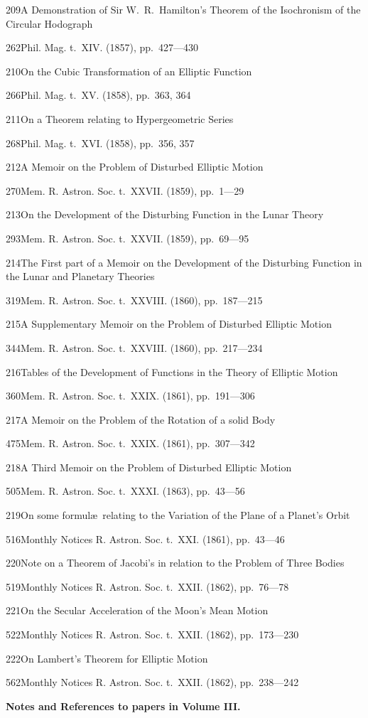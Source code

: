 \documentclass[11pt,a4paper]{book}
\providecommand{\tocentry}[2]{#1\dotfill #2\par}
\begin{document}
\tocentry{209}{A Demonstration of Sir W.~R.~Hamilton's Theorem of the Isochronism of the Circular Hodograph}{262}{Phil. Mag. t.~XIV. (1857), pp.~427---430}

\tocentry{210}{On the Cubic Transformation of an Elliptic Function}{266}{Phil. Mag. t.~XV. (1858), pp.~363, 364}

\tocentry{211}{On a Theorem relating to Hypergeometric Series}{268}{Phil. Mag. t.~XVI. (1858), pp.~356, 357}

\tocentry{212}{A Memoir on the Problem of Disturbed Elliptic Motion}{270}{Mem. R. Astron. Soc. t.~XXVII. (1859), pp.~1---29}

\tocentry{213}{On the Development of the Disturbing Function in the Lunar Theory}{293}{Mem. R. Astron. Soc. t.~XXVII. (1859), pp.~69---95}

\tocentry{214}{The First part of a Memoir on the Development of the Disturbing Function in the Lunar and Planetary Theories}{319}{Mem. R. Astron. Soc. t.~XXVIII. (1860), pp.~187---215}

\tocentry{215}{A Supplementary Memoir on the Problem of Disturbed Elliptic Motion}{344}{Mem. R. Astron. Soc. t.~XXVIII. (1860), pp.~217---234}

\newpage

\tocentry{216}{Tables of the Development of Functions in the Theory of Elliptic Motion}{360}{Mem. R. Astron. Soc. t.~XXIX. (1861), pp.~191---306}

\tocentry{217}{A Memoir on the Problem of the Rotation of a solid Body}{475}{Mem. R. Astron. Soc. t.~XXIX. (1861), pp.~307---342}

\tocentry{218}{A Third Memoir on the Problem of Disturbed Elliptic Motion}{505}{Mem. R. Astron. Soc. t.~XXXI. (1863), pp.~43---56}

\tocentry{219}{On some formul\ae\ relating to the Variation of the Plane of a Planet's Orbit}{516}{Monthly Notices R. Astron. Soc. t.~XXI. (1861), pp.~43---46}

\tocentry{220}{Note on a Theorem of Jacobi's in relation to the Problem of Three Bodies}{519}{Monthly Notices R. Astron. Soc. t.~XXII. (1862), pp.~76---78}

\tocentry{221}{On the Secular Acceleration of the Moon's Mean Motion}{522}{Monthly Notices R. Astron. Soc. t.~XXII. (1862), pp.~173---230}

\tocentry{222}{On Lambert's Theorem for Elliptic Motion}{562}{Monthly Notices R. Astron. Soc. t.~XXII. (1862), pp.~238---242}

\vspace{1cm}
\noindent\textbf{Notes and References to papers in Volume III.} 
\end{document}
